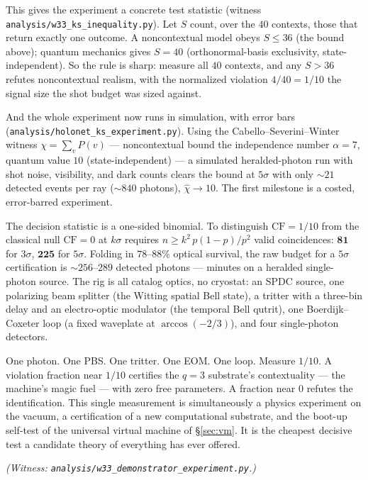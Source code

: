 \documentclass[11pt]{article}
\begin{document}
This gives the experiment a concrete test statistic (witness
\texttt{analysis/w33\_ks\_inequality.py}). Let $S$ count, over the $40$ contexts, those that return
exactly one outcome. A noncontextual model obeys $S\le36$ (the bound above); quantum mechanics gives
$S=40$ (orthonormal-basis exclusivity, state-independent). So the rule is sharp: measure all $40$
contexts, and any $S>36$ refutes noncontextual realism, with the normalized violation $4/40=1/10$ the
signal size the shot budget was sized against.

And the whole experiment now runs in simulation, with error bars
(\texttt{analysis/holonet\_ks\_experiment.py}). Using the Cabello--Severini--Winter witness
$\chi=\sum_v P(v)$ --- noncontextual bound the independence number $\alpha=7$, quantum value
$10$ (state-independent) --- a simulated heralded-photon run with shot noise, visibility, and dark
counts clears the bound at $5\sigma$ with only $\sim21$ detected events per ray ($\sim840$ photons),
$\hat\chi\to10$. The first milestone is a costed, error-barred experiment.

The decision statistic is a one-sided binomial. To distinguish $\mathrm{CF}=1/10$ from the classical
null $\mathrm{CF}=0$ at $k\sigma$ requires $n \ge k^2\,p(1-p)/p^2$ valid coincidences: $\mathbf{81}$ for
$3\sigma$, $\mathbf{225}$ for $5\sigma$. Folding in $78$--$88\%$ optical survival, the raw budget for a
$5\sigma$ certification is $\sim 256$--$289$ detected photons --- minutes on a heralded single-photon
source. The rig is all catalog optics, no cryostat: an SPDC source, one polarizing beam splitter (the
Witting spatial Bell state), a tritter with a three-bin delay and an electro-optic modulator (the
temporal Bell qutrit), one Boerdijk--Coxeter loop (a fixed waveplate at $\arccos(-2/3)$), and four
single-photon detectors.

\begin{keybox}{One photon. One PBS. One tritter. One EOM. One loop. Measure $1/10$.}
A violation fraction near $1/10$ certifies the $q=3$ substrate's contextuality --- the machine's magic
fuel --- with zero free parameters. A fraction near $0$ refutes the identification. This single
measurement is simultaneously a physics experiment on the vacuum, a certification of a new computational
substrate, and the boot-up self-test of the universal virtual machine of \S\ref{sec:vm}. It is the
cheapest decisive test a candidate theory of everything has ever offered.
\end{keybox}

\emph{(Witness: \texttt{analysis/w33\_demonstrator\_experiment.py}.)}
\end{document}
